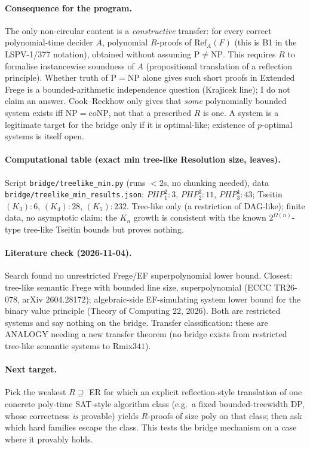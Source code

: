 \documentclass{article}
\begin{document}
\paragraph{Consequence for the program.} The only non-circular content is a \emph{constructive} transfer: for every correct polynomial-time decider $A$, polynomial $R$-proofs of $\mathrm{Ref}_A(F)$ (this is B1 in the LSPV-1/377 notation), obtained without assuming $\mathrm P\ne\mathrm{NP}$. This requires $R$ to formalise instancewise soundness of $A$ (propositional translation of a reflection principle). Whether truth of $\mathrm P=\mathrm{NP}$ alone gives such short proofs in Extended Frege is a bounded-arithmetic independence question (Krajicek line); I do not claim an answer. Cook--Reckhow only gives that \emph{some} polynomially bounded system exists iff $\mathrm{NP}=\mathrm{coNP}$, not that a prescribed $R$ is one. A system is a legitimate target for the bridge only if it is optimal-like; existence of $p$-optimal systems is itself open.

\paragraph{Computational table (exact min tree-like Resolution size, leaves).} Script \texttt{bridge/treelike\_min.py} (runs $<2$s, no chunking needed), data \texttt{bridge/treelike\_min\_results.json}: $PHP^{2}_{1}\!:3$, $PHP^{3}_{2}\!:11$, $PHP^{4}_{3}\!:43$; Tseitin$(K_3)\!:6$, $(K_4)\!:28$, $(K_5)\!:232$. Tree-like only (a restriction of DAG-like); finite data, no asymptotic claim; the $K_n$ growth is consistent with the known $2^{\Omega(n)}$-type tree-like Tseitin bounds but proves nothing.

\paragraph{Literature check (2026-11-04).} Search found no unrestricted Frege/EF superpolynomial lower bound. Closest: tree-like semantic Frege with bounded line size, superpolynomial (ECCC TR26-078, arXiv 2604.28172); algebraic-side EF-simulating system lower bound for the binary value principle (Theory of Computing 22, 2026). Both are restricted systems and say nothing on the bridge. Transfer classification: these are ANALOGY needing a new transfer theorem (no bridge exists from restricted tree-like semantic systems to $\mathrm{Rmix341}$).

\paragraph{Next target.} Pick the weakest $R\supseteq$ ER for which an explicit reflection-style translation of one concrete poly-time SAT-style algorithm class (e.g.\ a fixed bounded-treewidth DP, whose correctness \emph{is} provable) yields $R$-proofs of size $\mathrm{poly}$ on that class; then ask which hard families escape the class. This tests the bridge mechanism on a case where it provably holds.
\end{document}
